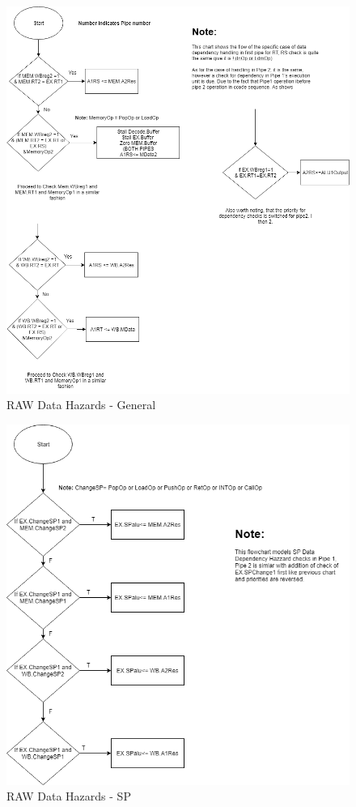 \documentclass[12pt]{article}
\theoremstyle{plain}
\theoremstyle{definition}
\begin{document}
\begin{figure}
    \centering
    \includegraphics[width=\textwidth,height=\textheight,keepaspectratio]{Diagrams/RawDataDependency1.png}
    \caption{RAW Data Hazards - General}
    \label{raw-chart}
\end{figure}

\begin{figure}
    \centering
    \includegraphics[width=\textwidth,keepaspectratio]{Diagrams/RawDataDependency2.png}
    \caption{RAW Data Hazards - SP}
    \label{raw1-chart}
\end{figure}
\end{document}
